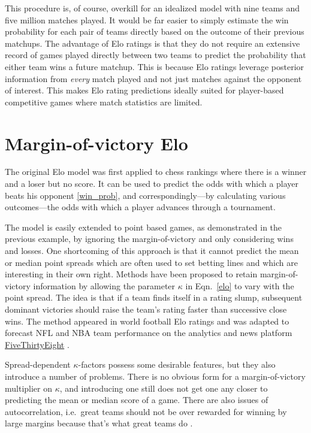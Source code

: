 \documentclass[aps,prc,reprint,amsmath,superscriptaddress,nofootinbib]{revtex4-1}
\begin{document}
This procedure is, of course, overkill for an idealized model with nine teams and five million matches played. It would be far easier to simply estimate the win probability for each pair of teams directly based on the outcome of their previous matchups.
The advantage of Elo ratings is that they do not require an extensive record of games played directly between two teams to predict the probability that either team wins a future matchup. This is because Elo ratings leverage posterior information from \emph{every} match played and not just matches against the opponent of interest.
This makes Elo rating predictions ideally suited for player-based competitive games where match statistics are limited.

\section{Margin-of-victory Elo}

The original Elo model was first applied to chess rankings where there is a winner and a loser but no score.
It can be used to predict the odds with which a player beats his opponent \eqref{win_prob}, and correspondingly---by calculating various outcomes---the odds with which a player advances through a tournament. 

The model is easily extended to point based games, as demonstrated in the previous example, by ignoring the margin-of-victory and only considering wins and losses.
One shortcoming of this approach is that it cannot predict the mean or median point spreads which are often used to set betting lines and which are interesting in their own right.
Methods have been proposed to retain margin-of-victory information by allowing the parameter $\kappa$ in Eqn.~\eqref{elo} to vary with the point spread.
The idea is that if a team finds itself in a rating slump, subsequent dominant victories should raise the team's rating faster than successive close wins.
The method appeared in world football Elo ratings \cite{footballratings} and was adapted to forecast NFL and NBA team performance on the analytics and news platform \href{www.fivethirtyeight.com}{FiveThirtyEight} \cite{538NFL, 538NBA}.

Spread-dependent $\kappa$-factors possess some desirable features, but they also introduce a number of problems.
There is no obvious form for a margin-of-victory multiplier on $\kappa$, and introducing one still does not get one any closer to predicting the mean or median score of a game.
There are also issues of autocorrelation, i.e.\ great teams should not be over rewarded for winning by large margins because that's what great teams do \cite{538NFL}.
\end{document}
